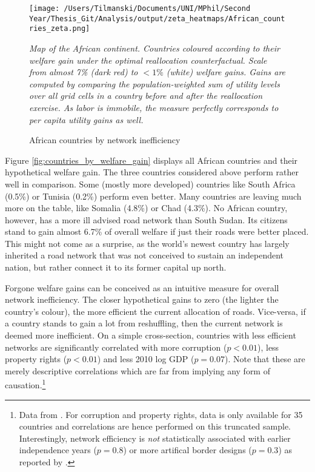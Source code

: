\documentclass[11pt, oneside]{article}   	%
\begin{document}
\begin{figure}
\centering
\caption{African countries by network inefficiency}
\texttt{[image: /Users/Tilmanski/Documents/UNI/MPhil/Second Year/Thesis\_Git/Analysis/output/zeta\_heatmaps/African\_countries\_zeta.png]}

\label{fig:countries_by_welfare_gain}
\justify
\begin{spacing}{0.7}
\textit{\footnotesize Map of the African continent. Countries coloured according to their welfare gain under the optimal reallocation counterfactual. Scale from almost 7\% (dark red) to $<1\%$ (white) welfare gains. Gains are computed by comparing the population-weighted sum of utility levels over all grid cells in a country before and after the reallocation exercise. As labor is immobile, the measure perfectly corresponds to per capita utility gains as well.}
\end{spacing}
\end{figure}

Figure \eqref{fig:countries_by_welfare_gain} displays all African countries and their hypothetical welfare gain. The three countries considered above perform rather well in comparison. Some (mostly more developed) countries like South Africa (0.5\%) or Tunisia (0.2\%) perform even better. Many countries are leaving much more on the table, like Somalia (4.8\%) or Chad (4.3\%). No African country, however, has a more ill advised road network than South Sudan. Its citizens stand to gain almost 6.7\% of overall welfare if just their roads were better placed. This might not come as a surprise, as the world's newest country has largely inherited a road network that was not conceived to sustain an independent nation, but rather connect it to its former capital up north.

Forgone welfare gains can be conceived as an intuitive measure for overall network inefficiency. The closer hypothetical gains to zero (the lighter the country's colour), the more efficient the current allocation of roads. Vice-versa, if a country stands to gain a lot from reshuffling, then the current network is deemed more inefficient. On a simple cross-section, countries with less efficient networks are significantly correlated with more corruption ($p < 0.01$), less property rights ($p < 0.01$) and less 2010 log GDP ($p=0.07$). Note that these are merely descriptive correlations which are far from implying any form of causation.\footnote{Data from \cite{the_world_bank_world_2017}. For corruption and property rights, data is only available for 35 countries and correlations are hence performed on this truncated sample. Interestingly, network efficiency is \emph{not} statistically associated with earlier independence years ($p=0.8$) or more artifical border designs ($p=0.3$) as reported by \cite{Alesina_ArtificialStates_2011}.}
\end{document}
